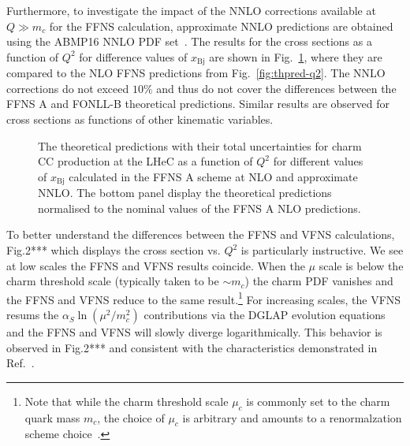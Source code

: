 \documentclass[pdftex,twocolumn,epjc3]{svjour3}          %
\newcommand{\abmp} {ABMP16\xspace}
\newcommand{\xbj}{\ensuremath{x_{\text{Bj}}}\xspace}
\newcommand{\fonll} {{FONLL-B}\xspace}
\newcommand{\ffns} {{FFNS A}\xspace}
\begin{document}
Furthermore, to investigate the impact of the NNLO corrections available at $Q \gg m_c$ for the FFNS calculation, approximate NNLO predictions are obtained using the \abmp NNLO PDF set~\cite{Alekhin:2017kpj}. The results for the cross sections as a function of $Q^2$ for difference values of \xbj are shown in Fig.~\ref{fig:thpred-q2-nnlo}, where they are compared to the NLO FFNS predictions from Fig.~\ref{fig:thpred-q2}. The NNLO corrections do not exceed $10\%$ and thus do not cover the differences between the \ffns and \fonll theoretical predictions. Similar results are observed for cross sections as functions of other kinematic variables.

\begin{figure}
    \centering
    \caption{The theoretical predictions with their total uncertainties for charm CC production at the LHeC as a function of $Q^2$ for different values of \xbj calculated in the \ffns scheme at NLO and approximate NNLO. The bottom panel display the theoretical predictions normalised to the nominal values of the \ffns NLO predictions.}
    \label{fig:thpred-q2-nnlo}
\end{figure}


\color{blue} %
To better understand the differences between the FFNS  and VFNS calculations, 
Fig.2*** which displays the cross section vs. $Q^2$ is particularly instructive. 
We see at low scales the FFNS and  VFNS results coincide. 
When the $\mu$ scale is below the charm threshold scale (typically taken to be $\sim m_c$)
the charm PDF vanishes and the FFNS and VFNS reduce to the same 
result.\footnote{Note that while the charm threshold scale $\mu_c$ is commonly 
set to the charm quark mass $m_c$, 
the choice of  $\mu_c$ is arbitrary and amounts to a 
renormalzation scheme choice~\cite{Bertone:2017ehk}.
}
%
For increasing scales, the VFNS resums the $\alpha_S \ln(\mu^2/m_c^2)$ contributions
via the DGLAP evolution equations and the FFNS and VFNS will slowly diverge logarithmically.
This behavior is observed in Fig.2*** and consistent with the characteristics demonstrated in 
Ref.~\cite{Kusina:2013slm}. 
\end{document}
